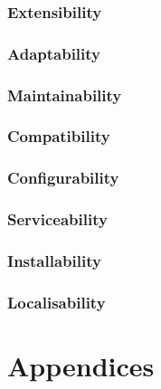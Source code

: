 \documentclass[11pt,a4paper,oneside,svgnames]{report}
\begin{document}
\subsection{Extensibility}

\subsection{Adaptability}

\subsection{Maintainability}

\subsection{Compatibility}

\subsection{Configurability}

\subsection{Serviceability}

\subsection{Installability}

\subsection{Localisability}


\chapter{Appendices}
\printglossaries{}

\listoffigures{}
\listoftables{}
\end{document}
